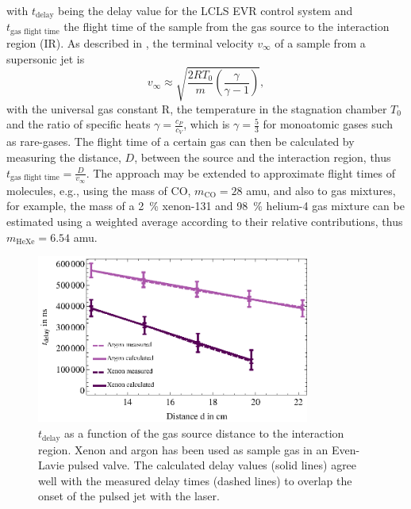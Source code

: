 with $t_{\text{delay}}$ being the delay value for the LCLS EVR control system and $t_{\text{gas flight time}}$ the flight time of the sample from the gas source to the interaction region (IR). As described in \citep{Miller-1988-Oxford}, the terminal velocity $v_{\infty}$ of a sample from a supersonic jet is
\begin{equation}
 v_{\infty} \approx \sqrt{\frac{2 R T_{0}}{m} \left(\frac{\gamma}{\gamma - 1}\right)},
\label{eqn:terminal-velocity}
\end{equation}
with the universal gas constant R, the temperature in the stagnation chamber $T_{0}$ and the ratio of specific heats $\gamma = \frac{c_{P}}{c_{V}}$, which is $\gamma = \frac{5}{3}$ for monoatomic gases such as rare-gases. The flight time of a certain gas can then be calculated by measuring the distance, $D$, between the source and the interaction region, thus $t_{\text{gas flight time}}=\frac{D}{v_{\infty}}$. The approach may be extended to approximate flight times of molecules, e.g., using the mass of CO, $m_{\text{CO}}=28$ amu, and also to gas mixtures, for example, the mass of a \SI{2}{\percent} xenon-131 and \SI{98}{\percent} helium-4 gas mixture can be estimated using a weighted average according to their relative contributions, thus  $m_{\text{HeXe}} = 6.54$ amu.\\[1\baselineskip]
\begin{figure}
	\centering
		\includegraphics[width=0.80\textwidth]{images/gas-jet-flight-times.eps}
	\caption[Event receiver time delay at LCLS for supersonic gas jets.]{$t_{\text{delay}}$ as a function of the gas source distance to the interaction region. Xenon and argon has been used as sample gas in an Even-Lavie pulsed valve. The calculated delay values (solid lines) agree well with the measured delay times (dashed lines) to overlap the onset of the pulsed jet with the laser.}
	\label{fig:LCLS-delay-data}
\end{figure}
